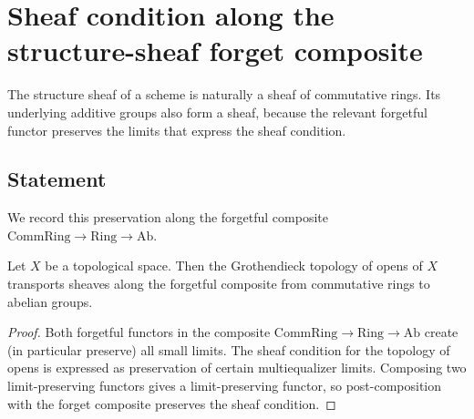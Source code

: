 \chapter{Sheaf condition along the structure-sheaf forget composite}
\label{chap:Cohomology_SheafCompose}

The structure sheaf of a scheme is naturally a sheaf of commutative rings. Its underlying additive groups also form a sheaf, because the relevant forgetful functor preserves the limits that express the sheaf condition.

\section{Statement}

We record this preservation along the forgetful composite
\(\mathrm{CommRing} \to \mathrm{Ring} \to \mathrm{Ab}\).

\begin{theorem}\leanok
  \label{thm:HasSheafCompose_forget}
  Let \(X\) be a topological space. Then the Grothendieck topology of opens of \(X\) transports sheaves along the forgetful composite from commutative rings to abelian groups.
\end{theorem}

\begin{proof}


\leanok
  Both forgetful functors in the composite \(\mathrm{CommRing} \to \mathrm{Ring} \to \mathrm{Ab}\) create (in particular preserve) all small limits. The sheaf condition for the topology of opens is expressed as preservation of certain multiequalizer limits. Composing two limit-preserving functors gives a limit-preserving functor, so post-composition with the forget composite preserves the sheaf condition.
\end{proof}
